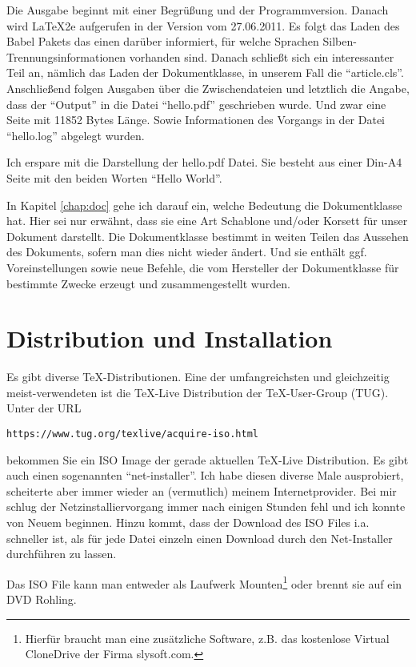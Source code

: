 Die Ausgabe beginnt mit einer Begrüßung und der Programmversion. Danach wird \LaTeX2e aufgerufen in der Version vom 27.06.2011. Es folgt das Laden des Babel Pakets das einen darüber informiert, für welche Sprachen Silben-Trennungsinformationen vorhanden sind. Danach schließt sich ein interessanter Teil an, nämlich das Laden der Dokumentklasse, in unserem Fall die "`article.cls"'. Anschließend folgen Ausgaben über die Zwischendateien und letztlich die Angabe, dass der "`Output"' in die Datei "`hello.pdf"' geschrieben wurde. Und zwar eine Seite mit 11852 Bytes Länge. Sowie Informationen des Vorgangs in der Datei "`hello.log"' abgelegt wurden. 

Ich erspare mit die Darstellung der hello.pdf Datei. Sie besteht aus einer Din-A4 Seite mit den beiden Worten "`Hello World"'.

In Kapitel \ref{chap:doc} gehe ich darauf ein, welche Bedeutung die Dokumentklasse hat. Hier sei nur erwähnt, dass sie eine Art Schablone und/oder Korsett für unser Dokument darstellt. Die Dokumentklasse bestimmt in weiten Teilen das Aussehen des Dokuments, sofern man dies nicht wieder ändert. Und sie enthält ggf. Voreinstellungen sowie neue Befehle, die vom Hersteller der Dokumentklasse für bestimmte Zwecke erzeugt und zusammengestellt wurden. 

\section{Distribution und Installation}

Es gibt diverse \TeX-Distributionen. Eine der umfangreichsten und gleichzeitig meist-verwendeten ist die \TeX-Live Distribution der \TeX-User-Group (TUG). Unter der URL 
\begin{verbatim}
https://www.tug.org/texlive/acquire-iso.html
\end{verbatim}
bekommen Sie ein ISO Image der gerade aktuellen \TeX-Live Distribution. Es gibt auch einen sogenannten "`net-installer"'. Ich habe diesen diverse Male ausprobiert, scheiterte aber immer wieder an (vermutlich) meinem Internetprovider. Bei mir schlug der Netzinstalliervorgang immer nach einigen Stunden fehl und ich konnte von Neuem beginnen. Hinzu kommt, dass der Download des ISO Files i.a. schneller ist, als für jede Datei einzeln einen Download durch den Net-Installer durchführen zu lassen. 

Das ISO File kann man entweder als Laufwerk Mounten\footnote{Hierfür braucht man eine zusätzliche Software, z.B. das kostenlose Virtual CloneDrive der Firma slysoft.com. } oder brennt sie auf ein DVD Rohling. 

